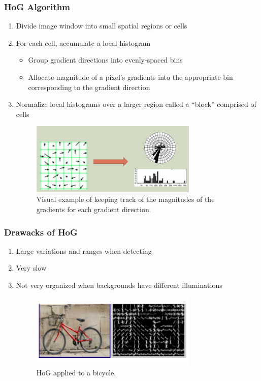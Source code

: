 \documentclass[letterpaper,12pt]{article}
\begin{document}
\subsubsection{HoG Algorithm}
\begin{enumerate}
 \item Divide image window into small spatial regions or cells
 \item For each cell, accumulate a local histogram
       \begin{itemize}
        \item Group gradient directions into evenly-spaced bins
        \item Allocate magnitude of a pixel's gradients into the appropriate bin corresponding to the gradient direction
       \end{itemize}
 \item Normalize local histograms over a larger region called a ``block'' comprised of cells
       \begin{figure}[h]
        \centering
        \includegraphics[width=0.75\textwidth]{images/histogram2.png}
        \caption{Visual example of keeping track of the magnitudes of the gradients for each gradient direction.}
       \end{figure}
\end{enumerate}

\subsubsection{Drawacks of HoG}
\begin{enumerate}
 \item Large variations and ranges when detecting
 \item Very slow
 \item Not very organized when backgrounds have different illuminations
       \begin{figure}[h]
        \centering
        \includegraphics[width=0.75\textwidth]{images/bike}
        \caption{HoG applied to a bicycle.}
       \end{figure}
\end{enumerate}
\end{document}
